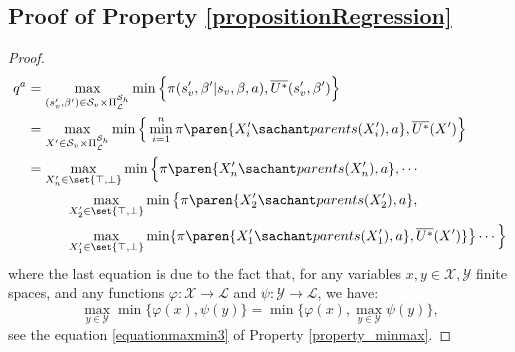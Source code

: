 \subsection{Proof of Property \ref{propositionRegression}}
\label{propositionRegression_RETURN}
\begin{proof}
\begin{align*}
q^a &= \max_{(s_v',\beta') \in \mathcal{S}_v \times \Pi^{\mathcal{S}_h}_{\mathcal{L}}} \min \Big\{ \pi(s_v',\beta' \vert s_v,\beta,a) , \overline{U^*}(s_v',\beta') \Big\} \\
&= \max_{X' \in \mathcal{S}_v \times \Pi^{\mathcal{S}_h}_{\mathcal{L}}}  \min \Big\{ \min_{i=1}^{n} \pi \paren{X_i' \sachant parents(X_i'),a} , \overline{U^*}(X') \Big\} \\
&= \max_{X'_n \in \set{ \top,\bot }} \min \Big\{ \pi \paren{X_n' \sachant parents(X_n'),a} , \cdots \\
& \hspace{1cm} \max_{X'_2 \in \set{\top,\bot}} \min \big\{ \pi \paren{X_2' \sachant parents(X_2'),a} , \\
& \hspace{1cm} \max_{X'_1 \in \set{\top,\bot}} \min \{ \pi \paren{ X_1'  \sachant parents(X_1'),a}, \overline{U^*}(X') \} \big\} \cdots  \Big\}
\end{align*}
where the last equation is due to the fact that, 
for any variables $x,y \in \mathcal{X}, \mathcal{Y}$ finite spaces, 
and any functions $\varphi: \mathcal{X} \rightarrow \mathcal{L}$ and $\psi: \mathcal{Y} \rightarrow \mathcal{L}$, we have:
\[
\max_{y \in \mathcal{Y}} \min \{ \varphi(x) , \psi(y) \} = \min \{ \varphi(x) , \max_{y \in \mathcal{Y}} \psi(y) \},
\]
see the equation \ref{equationmaxmin3} of Property \ref{property_minmax}.
\end{proof}


